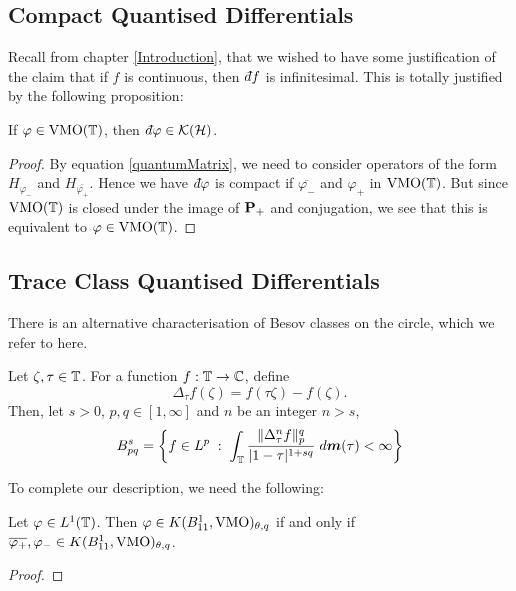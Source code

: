 \subsection{Compact Quantised Differentials}
Recall from chapter \ref{Introduction}, that we wished to have some justification
of the claim that if $f$ is continuous, then $\qd f$ is infinitesimal. This is totally
justified by the following proposition:
\begin{proposition}
    If $\varphi \in \operatorname{VMO}(\mathbb{T})$, then $\qd \varphi \in \mathcal{K}(\Hilb)$.
\end{proposition}
\begin{proof}
    By equation \ref{quantumMatrix}, we need to consider operators of the form $H_{\varphi_-}$
    and $H_{\overline{\varphi_+}}$. Hence we have $\qd \varphi$ is compact
    if $\overline{\varphi_-}$ and $\varphi_+$ in $\operatorname{VMO}(\mathbb{T})$. But 
    since $\operatorname{VMO}(\mathbb{T})$ is closed under the image of $\mathbf{P}_+$ and conjugation,
    we see that this is equivalent to $\varphi \in \operatorname{VMO}(\mathbb{T})$. 
\end{proof}


\subsection{Trace Class Quantised Differentials}
There is an alternative characterisation of Besov
classes on the circle, which we refer to here. 
\begin{proposition}
    Let $\zeta,\tau \in \mathbb{T}$. For a function
    $f:\mathbb{T}\to\mathbb{C}$, define
    \begin{equation}
        \Delta_\tau f(\zeta) = f(\tau\zeta)-f(\zeta).
    \end{equation}
    Then, let $s > 0$, $p,q \in [1,\infty]$ and $n$ be an integer $n > s$,
    \begin{equation}
        B_{pq}^s = \left\{f \in L^p\;:\;\int_{\mathbb{T}} \frac{\|\Delta^n_\tau f\|_p^q}{|1-\tau|^{1+sq}}\;d\boldsymbol{m}(\tau) < \infty\right\}
    \end{equation}
\end{proposition}

To complete our description, we need the following:
\begin{lemma}
    Let $\varphi \in L^1(\mathbb{T})$. Then $\varphi \in K(B_{11}^1,\operatorname{VMO})_{\theta,q}$ if and only
    if $\overline{\varphi_+},\varphi_- \in K(B_{11}^1,\operatorname{VMO})_{\theta,q}$.
\end{lemma}
\begin{proof}
    
\end{proof}
    
